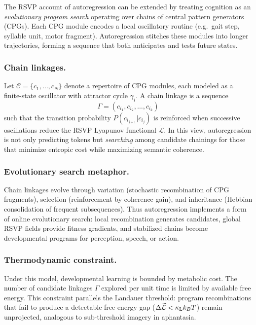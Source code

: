 \documentclass[a4paper,11pt]{article}
\begin{document}
The RSVP account of autoregression can be extended by treating cognition as an
\emph{evolutionary program search} operating over chains of central pattern
generators (CPGs). Each CPG module encodes a local oscillatory routine
(e.g.\ gait step, syllable unit, motor fragment). Autoregression stitches these
modules into longer trajectories, forming a sequence that both anticipates and
tests future states.

\subsubsection{Chain linkages.}
Let $\mathcal{C}=\{c_1,\dots,c_N\}$ denote a repertoire of CPG modules, each
modeled as a finite-state oscillator with attractor cycle $\gamma_i$. A chain
linkage is a sequence
\begin{equation}
\Gamma=(c_{i_1},c_{i_2},\dots,c_{i_k})
\end{equation}
such that the transition probability $P(c_{i_{j+1}}|c_{i_j})$ is reinforced
when successive oscillations reduce the RSVP Lyapunov functional
$\widetilde{\mathcal{L}}$. In this view, autoregression is not only predicting
tokens but \emph{searching} among candidate chainings for those that minimize
entropic cost while maximizing semantic coherence.

\subsubsection{Evolutionary search metaphor.}
Chain linkages evolve through variation (stochastic recombination of CPG
fragments), selection (reinforcement by coherence gain), and inheritance
(Hebbian consolidation of frequent subsequences). Thus autoregression
implements a form of online evolutionary search: local recombination generates
candidates, global RSVP fields provide fitness gradients, and stabilized
chains become developmental programs for perception, speech, or action.

\subsubsection{Thermodynamic constraint.}
Under this model, developmental learning is bounded by metabolic cost. The
number of candidate linkages $\Gamma$ explored per unit time is limited by
available free energy. This constraint parallels the Landauer threshold:
program recombinations that fail to produce a detectable free-energy gap
($\Delta\widetilde{\mathcal{L}} < \kappa_{\rm L} k_B T$) remain unprojected,
analogous to sub-threshold imagery in aphantasia.
\end{document}
